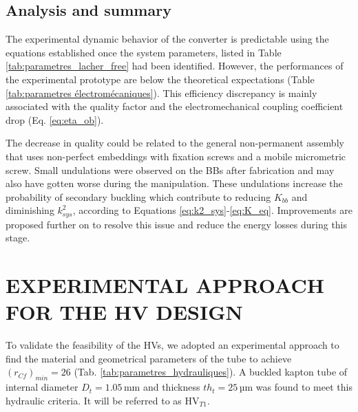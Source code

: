 \documentclass[3p,twocolumn,preprint]{elsarticle}
\begin{document}
	\subsection{Analysis and summary}	
	\label{subsec:Analyze and summary}
The experimental dynamic behavior of the converter is predictable using the equations established once the system parameters, listed in Table \ref{tab:parametres_lacher_free} had been identified. However, the performances of the experimental prototype are below the theoretical expectations (Table \ref{tab:parametres électromécaniques}). This efficiency discrepancy is mainly associated with the quality factor and the electromechanical coupling coefficient drop (Eq. \ref{eq:eta_ob}). 

The decrease in quality could be related to the general non-permanent assembly that uses non-perfect embeddings with fixation screws and a mobile micrometric screw. Small undulations were observed on the BBs after fabrication and may also have gotten worse during the manipulation. These undulations increase the probability of secondary buckling which contribute to reducing $K_{bb}$ and diminishing $k^2_{sys}$, according to Equations \ref{eq:k2_sys}-\ref{eq:K_eq}. Improvements are proposed further on to resolve this issue and reduce the energy losses during this stage.

\section{EXPERIMENTAL APPROACH FOR THE HV \mbox{DESIGN}}
\label{sec:EXPERIMENTAL APPROACH FOR THE HV DESIGN}
To validate the feasibility of the HVs, we adopted an experimental approach to find the material and geometrical parameters of the tube to achieve $(r_{Cf})_{min}=26$ (Tab. \ref{tab:parametres_hydrauliques}). A buckled kapton tube \cite{Dupont2012} of internal diameter $D_t=1.05$\,mm and thickness $th_t=25$\,µm was found to meet this hydraulic criteria. It will be referred to as HV$_{T1}$. 
\end{document}
